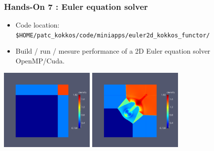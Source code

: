 \begin{frame}[fragile=singleslide]
  \frametitle{Hands-On 7 : Euler equation solver}

  \begin{itemize}
  \item Code location: \texttt{\$HOME/patc\_kokkos/code/miniapps/euler2d\_kokkos\_functor/}
  \item Build / run / mesure performance of a 2D Euler equation solver OpenMP/Cuda.
  \end{itemize}
  
  \begin{center}
    \includegraphics[height=4cm]{../euler/images/riemann/riemann_1}
    \hspace{0.1cm}
    \includegraphics[height=4cm]{../euler/images/riemann/riemann_2}
  \end{center}


\end{frame}
